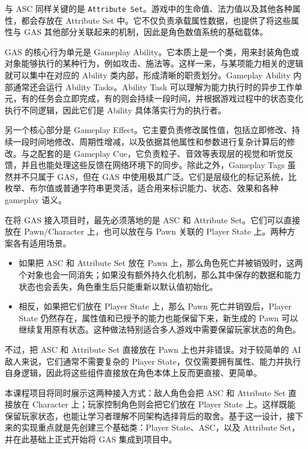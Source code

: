 与 ASC 同样关键的是 \texttt{Attribute Set}。游戏中的生命值、法力值以及其他各种属性，都会存放在 Attribute Set 中。它不仅负责承载属性数据，也提供了将这些属性与 GAS 其他部分关联起来的机制，因此是角色数值系统的基础载体。

GAS 的核心行为单元是 Gameplay Ability。它本质上是一个类，用来封装角色或对象能够执行的某种行为，例如攻击、施法等。这样一来，与某项能力相关的逻辑就可以集中在对应的 Ability 类内部，形成清晰的职责划分。Gameplay Ability 内部通常还会运行 Ability Tasks。Ability Task 可以理解为能力执行时的异步工作单元，有的任务会立即完成，有的则会持续一段时间，并根据游戏过程中的状态变化执行不同逻辑，因此它们是 Ability 具体落实行为的执行者。

另一个核心部分是 Gameplay Effect。它主要负责修改属性值，包括立即修改、持续一段时间地修改、周期性增减，以及依据其他属性和参数进行复杂计算后的修改。与之配套的是 Gameplay Cue，它负责粒子、音效等表现层的视觉和听觉反馈，并且也能处理这些反馈在网络环境下的同步。除此之外，Gameplay Tags 虽然并不只属于 GAS，但在 GAS 中使用极其广泛。它们是层级化的标记系统，比枚举、布尔值或普通字符串更灵活，适合用来标识能力、状态、效果和各种 gameplay 语义。

在将 GAS 接入项目时，最先必须落地的是 ASC 和 Attribute Set。它们可以直接放在 Pawn/Character 上，也可以放在与 Pawn 关联的 Player State 上。两种方案各有适用场景。
\begin{itemize}
	\item 如果把 ASC 和 Attribute Set 放在 Pawn 上，那么角色死亡并被销毁时，这两个对象也会一同消失；如果没有额外持久化机制，那么其中保存的数据和能力状态也会丢失，角色重生后只能重新以默认值初始化。
	\item 相反，如果把它们放在 Player State 上，那么 Pawn 死亡并销毁后，Player State 仍然存在，属性值和已授予的能力也能保留下来，新生成的 Pawn 可以继续复用原有状态。这种做法特别适合多人游戏中需要保留玩家状态的角色。
\end{itemize}
不过，把 ASC 和 Attribute Set 直接放在 Pawn 上也并非错误。对于较简单的 AI 敌人来说，它们通常不需要复杂的 Player State，仅仅需要拥有属性、能力并执行自身逻辑，因此将这些组件直接放在角色本体上反而更直接、更简单。

本课程项目将同时展示这两种接入方式：敌人角色会把 ASC 和 Attribute Set 直接放在 Character 上；玩家控制角色则会把它们放在 Player State 上。这样既能保留玩家状态，也能让学习者理解不同架构选择背后的取舍。基于这一设计，接下来的实现重点就是先创建三个基础类：Player State、ASC，以及 Attribute Set，并在此基础上正式开始将 GAS 集成到项目中。

